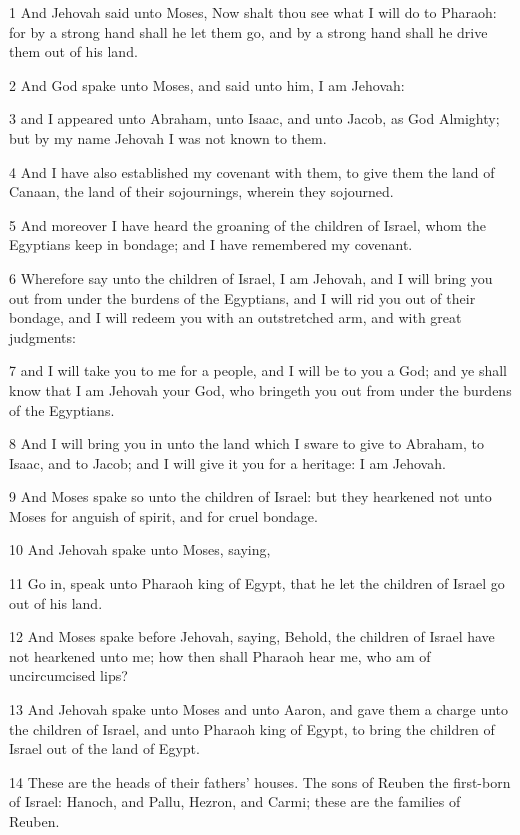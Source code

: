 \par 1 And Jehovah said unto Moses, Now shalt thou see what I will do to Pharaoh: for by a strong hand shall he let them go, and by a strong hand shall he drive them out of his land.
\par 2 And God spake unto Moses, and said unto him, I am Jehovah:
\par 3 and I appeared unto Abraham, unto Isaac, and unto Jacob, as God Almighty; but by my name Jehovah I was not known to them.
\par 4 And I have also established my covenant with them, to give them the land of Canaan, the land of their sojournings, wherein they sojourned.
\par 5 And moreover I have heard the groaning of the children of Israel, whom the Egyptians keep in bondage; and I have remembered my covenant.
\par 6 Wherefore say unto the children of Israel, I am Jehovah, and I will bring you out from under the burdens of the Egyptians, and I will rid you out of their bondage, and I will redeem you with an outstretched arm, and with great judgments:
\par 7 and I will take you to me for a people, and I will be to you a God; and ye shall know that I am Jehovah your God, who bringeth you out from under the burdens of the Egyptians.
\par 8 And I will bring you in unto the land which I sware to give to Abraham, to Isaac, and to Jacob; and I will give it you for a heritage: I am Jehovah.
\par 9 And Moses spake so unto the children of Israel: but they hearkened not unto Moses for anguish of spirit, and for cruel bondage.
\par 10 And Jehovah spake unto Moses, saying,
\par 11 Go in, speak unto Pharaoh king of Egypt, that he let the children of Israel go out of his land.
\par 12 And Moses spake before Jehovah, saying, Behold, the children of Israel have not hearkened unto me; how then shall Pharaoh hear me, who am of uncircumcised lips?
\par 13 And Jehovah spake unto Moses and unto Aaron, and gave them a charge unto the children of Israel, and unto Pharaoh king of Egypt, to bring the children of Israel out of the land of Egypt.
\par 14 These are the heads of their fathers' houses. The sons of Reuben the first-born of Israel: Hanoch, and Pallu, Hezron, and Carmi; these are the families of Reuben.
